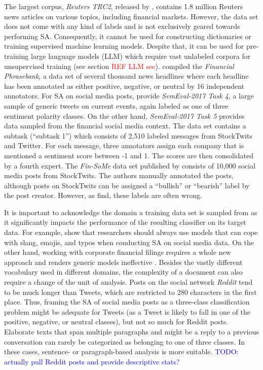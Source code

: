 The largest corpus, \emph{Reuters TRC2}, released by , contains 1.8 million Reuters news articles on various topics, including financial markets. However, the data set does not come with any kind of labels and is not exclusively geared towards performing SA. Consequently, it cannot be used for constructing dictionaries or training supervised machine learning models. Despite that, it can be used for pre-training large language models (LLM) which require vast unlabeled corpora for unsupervised training (see section \textcolor{red}{REF LLM sec}).  compiled the \emph{Financial Phrasebank}, a data set of several thousand news headlines where each headline has been annotated as either positive, negative, or neutral by 16 independent annotators. For SA on social media posts,  provide \emph{SemEval-2017 Task 4}, a large sample of generic tweets on current events, again labeled as one of three sentiment polarity classes. On the other hand, \emph{SemEval-2017 Task 5}  provides data sampled from the financial social media context. The data set contains a subtask (``subtask 1'') which consists of 2,510 labeled messages from StockTwits and Twitter. For each message, three annotators assign each company that is mentioned a sentiment score between -1 and 1. The scores are then consolidated by a fourth expert. The \emph{Fin-SoMe} data set published by  consists of 10,000 social media posts from StockTwits. The authors manually annotated the posts, although posts on StockTwits can be assigned a ``bullish'' or ``bearish'' label by the post creator. However, as  find, these labels are often wrong.

 It is important to acknowledge the domain a training data set is sampled from as it significantly impacts the performance of the resulting classifier on its target data. For example,  show that researchers should always use models that can cope with slang, emojis, and typos when conducting SA on social media data. On the other hand, working with corporate financial filings requires a whole new approach and renders generic models ineffective . Besides the vastly different vocabulary used in different domains, the complexity of a document can also require a change of the unit of analysis. Posts on the social network \emph{Reddit} tend to be much longer than Tweets, which are restricted to 280 characters in the first place. Thus, framing the SA of social media posts as a three-class classification problem might be adequate for Tweets (as a Tweet is likely to fall in one of the positive, negative, or neutral classes), but not so much for Reddit posts. Elaborate texts that span multiple paragraphs and might be a reply to a previous conversation can rarely be categorized as belonging to one of three classes. In these cases, sentence- or paragraph-based analysis is more suitable. \textcolor{blue}{TODO: actually pull Reddit posts and provide descriptive stats?}
 




